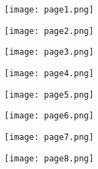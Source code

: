 \documentclass[a4paper]{report}
\begin{document}
\noindent
\texttt{[image: page1.png]}

\noindent
\texttt{[image: page2.png]}

\noindent
\texttt{[image: page3.png]}

\noindent
\texttt{[image: page4.png]}

\noindent
\texttt{[image: page5.png]}

\noindent
\texttt{[image: page6.png]}

\noindent
\texttt{[image: page7.png]}

\noindent
\texttt{[image: page8.png]}
\end{document}
